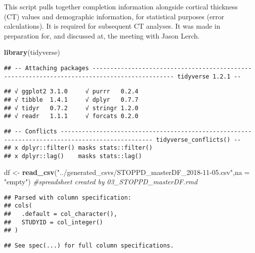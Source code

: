 \documentclass[]{article}
\newenvironment{Shaded}{\begin{snugshade}}{\end{snugshade}}
\newcommand{\KeywordTok}[1]{\textcolor[rgb]{0.13,0.29,0.53}{\textbf{#1}}}
\newcommand{\DataTypeTok}[1]{\textcolor[rgb]{0.13,0.29,0.53}{#1}}
\newcommand{\StringTok}[1]{\textcolor[rgb]{0.31,0.60,0.02}{#1}}
\newcommand{\CommentTok}[1]{\textcolor[rgb]{0.56,0.35,0.01}{\textit{#1}}}
\newcommand{\NormalTok}[1]{#1}
\theoremstyle{definition}
\theoremstyle{definition}
\theoremstyle{definition}
\theoremstyle{remark}
\begin{document}
This script pulls together completion information alongside cortical
thickness (CT) values and demographic information, for statistical
purposes (error calculations). It is required for subsequent CT
analyses. It was made in preparation for, and discussed at, the meeting
with Jason Lerch.

\begin{Shaded}
\begin{Highlighting}[]
\KeywordTok{library}\NormalTok{(tidyverse)}
\end{Highlighting}
\end{Shaded}

\begin{verbatim}
## -- Attaching packages --------------------------------------------------------------------------------------------- tidyverse 1.2.1 --
\end{verbatim}

\begin{verbatim}
## √ ggplot2 3.1.0     √ purrr   0.2.4
## √ tibble  1.4.1     √ dplyr   0.7.7
## √ tidyr   0.7.2     √ stringr 1.2.0
## √ readr   1.1.1     √ forcats 0.2.0
\end{verbatim}

\begin{verbatim}
## -- Conflicts ------------------------------------------------------------------------------------------------ tidyverse_conflicts() --
## x dplyr::filter() masks stats::filter()
## x dplyr::lag()    masks stats::lag()
\end{verbatim}

\begin{Shaded}
\begin{Highlighting}[]
\NormalTok{df <-}\StringTok{ }\KeywordTok{read_csv}\NormalTok{(}\StringTok{"../generated_csvs/STOPPD_masterDF_2018-11-05.csv"}\NormalTok{,}\DataTypeTok{na =} \StringTok{"empty"}\NormalTok{) }\CommentTok{#spreadsheet created by 03_STOPPD_masterDF.rmd}
\end{Highlighting}
\end{Shaded}

\begin{verbatim}
## Parsed with column specification:
## cols(
##   .default = col_character(),
##   STUDYID = col_integer()
## )
\end{verbatim}

\begin{verbatim}
## See spec(...) for full column specifications.
\end{verbatim}
\end{document}
